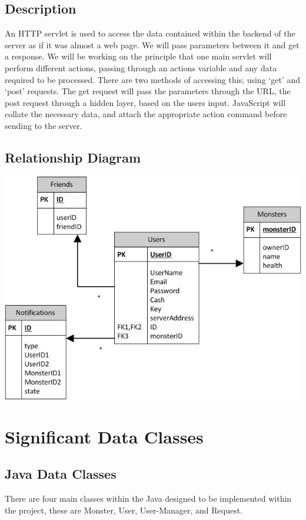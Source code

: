 \documentclass{project}
\begin{document}
\subsection{Description}
An HTTP servlet is used to access the data contained within the backend of the server as if it was almost a web page.  We will pass parameters between it and get a response. We will be working on the principle that one main servlet will perform different actions, passing through an actions variable and any data required to be processed. There are two methods of accessing this; using ‘get’ and ‘post’ requests.  The get request will pass the parameters through the URL, the post request through a hidden layer, based on the users input. JavaScript will collate the necessary data, and attach the appropriate action command before sending to the server.
\subsection{Relationship Diagram}
\includegraphics{relationshipDiagram.jpg}



\section{Significant Data Classes}
\subsection{Java Data Classes}
There are four main classes within the Java designed to be implemented within the project, these are Monster, User, User-Manager, and Request.
\end{document}
